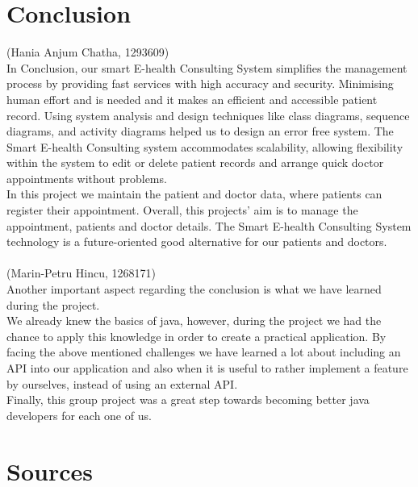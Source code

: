 \documentclass[a4paper, 12pt]{report}
\begin{document}
\chapter{Conclusion}
{\tiny (Hania Anjum Chatha, 1293609)\\}
In Conclusion, our smart E-health Consulting System simplifies the management process by providing fast services with high accuracy and security. Minimising human effort and is needed and it  makes an efficient and accessible patient record. Using system analysis and design techniques like class diagrams, sequence diagrams, and activity diagrams helped us to design an error free system. The Smart E-health Consulting system accommodates scalability, allowing flexibility within the system to edit or delete patient records and arrange quick doctor appointments without problems. \\
In this project we maintain the patient and doctor data, where patients can register their appointment. Overall, this projects' aim is to manage the appointment, patients and doctor details. The Smart E-health Consulting System technology is a future-oriented good alternative for our patients and doctors.\\\\
{\tiny (Marin-Petru Hincu, 1268171)\\}
Another important aspect regarding the conclusion is what we have learned during the project.\\
We already knew the basics of java, however, during the project we had the chance to apply this knowledge in order to create a practical application. By facing the above mentioned challenges we have learned a lot about including an API into our application and also when it is useful to rather implement a feature by ourselves, instead of using an external API. \\
Finally, this group project was a great step towards becoming better java developers for each one of us. 

\chapter{Sources}
\end{document}
